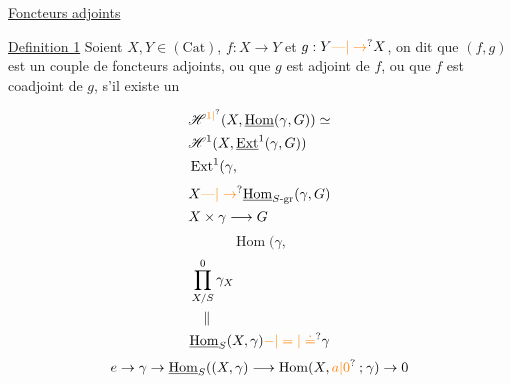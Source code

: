 \uline{Foncteurs adjoints}

\uline{Definition 1} Soient $X,Y\in(\mathrm{Cat})$, $f:X\to Y$ et $g:Y\unsure{\text{---}|\to}X$, on dit que $(f,g)$ est un couple de foncteurs adjoints, ou que $g$ est adjoint de $f$, ou que $f$ est coadjoint de $g$, s'il existe un


\[
\begin{aligned}
&\mathscr H^{\unsure{1|{}}}(X,\underline{\operatorname{Hom}}(\gamma,G))\simeq\\
&\mathscr H^1(X,\underline{\operatorname{Ext}}^1(\gamma,G))\\
&\operatorname{Ext}^1(\gamma,
\end{aligned}
\]
\[
\begin{aligned}
&X\unsure{\text{---}|\to}\underline{\operatorname{Hom}}_{S\text{-gr}}(\gamma,G)\\
&X\times\gamma\longrightarrow G
\end{aligned}
\]
\[
\operatorname{Hom}(\gamma,
\]
\[
\begin{aligned}
&\prod_{X/S}^{0}\gamma_X\\
&\quad\Vert\\
&\underline{\operatorname{Hom}}_S(X,\gamma)\unsure{-|=|\doteq}\gamma
\end{aligned}
\]
\[
e\to\gamma\to\underline{\operatorname{Hom}}_S((X,\gamma)\longrightarrow
\operatorname{Hom}(X,\unsure{a|0}\mathbin{;}\gamma)\to0
\]
